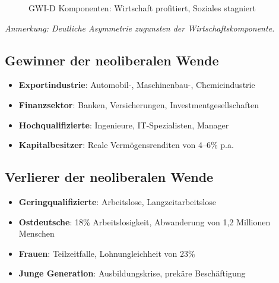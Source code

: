 \begin{figure}[ht]
    \centering
    \caption{GWI-D Komponenten: Wirtschaft profitiert, Soziales stagniert}
    \label{fig:gewinner_konsolidierung}
\end{figure}

\begin{flushleft}
\footnotesize{\textit{Anmerkung: Deutliche Asymmetrie zugunsten der Wirtschaftskomponente.}}
\end{flushleft}

\subsection{Gewinner der neoliberalen Wende}

\begin{itemize}
    \item \textbf{Exportindustrie}: Automobil-, Maschinenbau-, Chemieindustrie
    \item \textbf{Finanzsektor}: Banken, Versicherungen, Investmentgesellschaften
    \item \textbf{Hochqualifizierte}: Ingenieure, IT-Spezialisten, Manager
    \item \textbf{Kapitalbesitzer}: Reale Vermögensrenditen von 4–6\% p.a.
\end{itemize}

\subsection{Verlierer der neoliberalen Wende}

\begin{itemize}
    \item \textbf{Geringqualifizierte}: Arbeitslose, Langzeitarbeitslose
    \item \textbf{Ostdeutsche}: 18\% Arbeitslosigkeit, Abwanderung von 1,2 Millionen Menschen
    \item \textbf{Frauen}: Teilzeitfalle, Lohnungleichheit von 23\%
    \item \textbf{Junge Generation}: Ausbildungskrise, prekäre Beschäftigung
\end{itemize}

